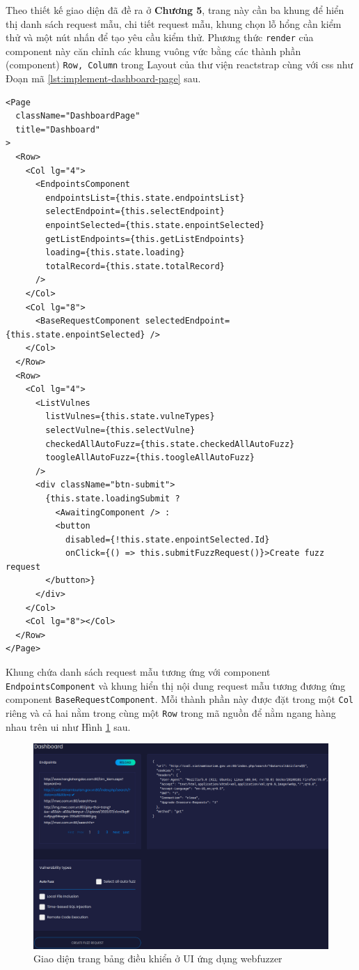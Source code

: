 Theo thiết kế giao diện đã đề ra ở \textbf{Chương 5}, trang này cần ba khung để hiển thị danh sách request mẫu, chi tiết request mẫu, khung chọn lỗ hổng cần kiểm thử và một nút nhấn để tạo yêu cầu kiểm thử. Phương thức \texttt{render} của component này căn chỉnh các khung vuông vức bằng các thành phần (component) \texttt{Row, Column} trong Layout của thư viện reactstrap cùng với \acrshort{css} như Đoạn mã \ref{lst:implement-dashboard-page} sau.
\begin{lstlisting}[style=ES6, label={lst:implement-dashboard-page}, caption={Phương thức \texttt{render} của trang bảng điều khiển}]
<Page
  className="DashboardPage"
  title="Dashboard"
>
  <Row>
    <Col lg="4">
      <EndpointsComponent
        endpointsList={this.state.endpointsList}
        selectEndpoint={this.selectEndpoint}
        enpointSelected={this.state.enpointSelected}
        getListEndpoints={this.getListEndpoints}
        loading={this.state.loading}
        totalRecord={this.state.totalRecord}
      />
    </Col>
    <Col lg="8">
      <BaseRequestComponent selectedEndpoint={this.state.enpointSelected} />
    </Col>
  </Row>
  <Row>
    <Col lg="4">
      <ListVulnes
        listVulnes={this.state.vulneTypes}
        selectVulne={this.selectVulne}
        checkedAllAutoFuzz={this.state.checkedAllAutoFuzz}
        toogleAllAutoFuzz={this.toogleAllAutoFuzz}
      />
      <div className="btn-submit">
        {this.state.loadingSubmit ?
          <AwaitingComponent /> :
          <button
            disabled={!this.state.enpointSelected.Id}
            onClick={() => this.submitFuzzRequest()}>Create fuzz request
        </button>}
      </div>
    </Col>
    <Col lg="8"></Col>
  </Row>
</Page>
\end{lstlisting}
Khung chứa danh sách request mẫu tương ứng với component \texttt{EndpointsComponent} và khung hiển thị nội dung request mẫu tương đương ứng component \texttt{BaseRequestComponent}. Mỗi thành phần này được đặt trong một \texttt{Col} riêng và cả hai nằm trong cùng một \texttt{Row} trong mã nguồn để nằm ngang hàng nhau trên \acrshort{ui} như Hình \ref{fig:dashboard-ui} sau.
\FloatBarrier
\begin{figure}
    \centering
        \includegraphics[scale=0.45,keepaspectratio=true]{images/dashboard-ui.png}
    \caption{Giao diện trang bảng điều khiển ở UI ứng dụng webfuzzer}
    \label{fig:dashboard-ui}
\end{figure}

